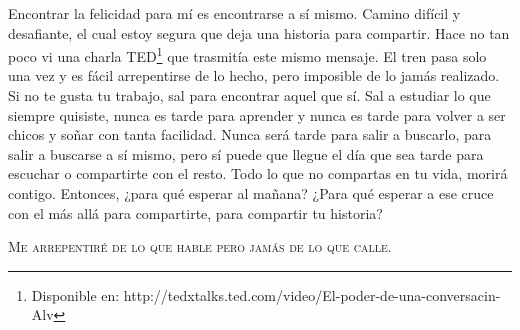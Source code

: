\documentclass[12t, a4 paper]{article}
\begin{document}
Encontrar la felicidad para m\'i es encontrarse a s\'i mismo. Camino dif\'icil y desafiante, el cual  estoy segura que deja una historia para compartir. Hace no tan poco vi una charla TED\footnote{Disponible en: http://tedxtalks.ted.com/video/El-poder-de-una-conversacin-Alv}  que trasmit\'ia este mismo mensaje. El tren pasa solo una vez y es f\'acil arrepentirse de lo hecho, pero imposible de lo jam\'as realizado. Si no te gusta tu trabajo, sal para encontrar aquel que s\'i. Sal a estudiar lo que siempre quisiste, nunca es tarde para aprender y nunca es tarde para volver a ser chicos y so\~nar con tanta facilidad. Nunca ser\'a tarde para salir a buscarlo, para salir a buscarse a s\'i mismo, pero s\'i puede que llegue el d\'ia que sea tarde para escuchar o compartirte con el resto. Todo lo que no compartas en tu vida, morir\'a contigo. Entonces, ¿para qu\'e esperar al ma\~nana? ¿Para qu\'e esperar a ese cruce con el m\'as all\'a para compartirte, para compartir tu historia? 

\vspace{2mm}

\textsc{Me arrepentir\'e de lo que hable pero jam\'as de lo que calle.}
\end{document}
